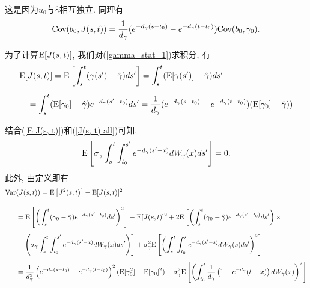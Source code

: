 \documentclass[notitlepage,cs4size,punct,oneside]{ctexrep}
\numberwithin{equation}{section}
\theoremstyle{mystyle}
\begin{document}
这是因为$u_0$与$\hat{\gamma}$相互独立. 同理有
\begin{equation} \label{Cov b0 J(s, t)}
\text{Cov}(b_0, J(s, t)) = \frac{1}{d_\gamma}(e^{-d_\gamma(s-t_0)}-e^{-d_\gamma(t-t_0)})\text{Cov}(b_0, \gamma_0).
\end{equation}

为了计算$\text{E}[J(s, t)]$, 我们对(\ref{gamma_stat_1})求积分, 有
\begin{equation} \label{E J(s, t)}
\begin{split}
\text{E}[&J(s, t)] = \text{E}\left[\int_s^t (\gamma(s')-\hat{\gamma})ds'\right] = \int_s^t (\text{E}[\gamma(s')]-\hat{\gamma})ds' \\[5pt]
&= \int_s^t (\text{E}[\gamma_0]-\hat{\gamma})e^{-d_\gamma(s'-t_0)}ds' = \frac{1}{d_\gamma}(e^{-d_\gamma(s-t_0)}-e^{-d_\gamma(t-t_0)})(\text{E}[\gamma_0]-\hat{\gamma}))
\end{split}
\end{equation}

结合(\ref{E J(s, t)})和(\ref{J(s, t) all})可知,
\[
\text{E}\left[\sigma_\gamma\int_s^t\int_{t_0}^{s'}e^{-d_\gamma(s'-x)}dW_\gamma(x)ds'\right] = 0.
\]
此外, 由定义即有
\[
\begin{split}
\text{Var}&(J(s, t)) = \text{E}\left[J^2(s, t)\right] - \text{E}[J(s, t)]^2 \\[10pt]
&= \text{E}\left[\left(\int_s^t (\gamma_0-\hat{\gamma})e^{-d_\gamma(s'-t_0)}ds'\right)^2\right] - \text{E}[J(s, t)]^2 + 2\text{E}\left[\left(\int_s^t(\gamma_0-\hat{\gamma})e^{-d_\gamma(s'-t_0)}ds'\right)\times\right. \\[5pt]
&\quad\left.\left(\sigma_\gamma\int_s^t\int_{t_0}^{s'}e^{-d_\gamma(s'-x)}dW_\gamma(x)ds'\right)\right] + \sigma_\gamma^2\text{E}\left[\left(\int_s^t\int_{t_0}^{s}e^{-d_\gamma(s'-s)}dW_\gamma(s)ds'\right)^2\right] \\[5pt]
&= \frac{1}{d_\gamma^2}\left(e^{-d_\gamma(s-t_0)}-e^{-d_\gamma(t-t_0)}\right)^2(\text{E}[\gamma_0^2]-\text{E}[\gamma_0]^2) + \sigma_\gamma^2\text{E}\left[\left(\int_{t_0}^t \frac{1}{d_\gamma}\left(1-e^{-d_\gamma}(t-x)\right)dW_\gamma(x)\right)^2\right]
\end{split}
\]
\end{document}
